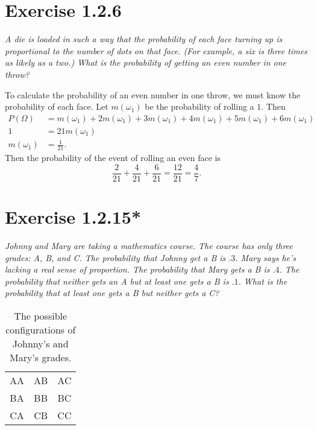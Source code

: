 \documentclass{tufte-handout}
\begin{document}
\section{Exercise 1.2.6}

\begin{description}
\item \textit{A die is loaded in such a way that the probability of
    each face turning up is proportional to the number of dots on that
    face. (For example, a six is three times as likely as a two.) What
    is the probability of getting an even number in one throw?}
\end{description}

To calculate the probability of an even number in one throw, we must
know the probability of each face. Let $m(\omega_1)$ be the probability of
rolling a $1$. Then
\begin{align*}
  P(\Omega) &= m(\omega_1) + 2m(\omega_1) + 3m(\omega_1) + 4m(\omega_1) +
  5m(\omega_1) + 6m(\omega_1)\\
  1 &= 21m(\omega_1)\\
  m(\omega_1) &= \frac{1}{21}.
\end{align*}
Then the probability of the event of rolling an even face is
\[\frac{2}{21} + \frac{4}{21} + \frac{6}{21} = \frac{12}{21} =
\frac{4}{7}.\]

\section{Exercise 1.2.15*}

\begin{description}
\item \textit{Johnny and Mary are taking a mathematics course. The course has
    only three grades: A, B, and C. The probability that Johnny get a
    B is $.3$. Mary says he's lacking a real sense of proportion. The
    probability that Mary gets a B is $.4$. The probability that
    neither gets an A but at least one gets a B is $.1$. What is the
    probability that at least one gets a B but neither gets a C?}
\end{description}

\begin{table}[h]
  \centering
  \begin{tabular}{ccc}
    \toprule
    AA & AB & AC \\
    BA & BB & BC \\
    CA & CB & CC \\
    \bottomrule
  \end{tabular}
  \caption{The possible configurations of Johnny's and Mary's grades.}
  \label{tab:1.2.15}
\end{table}
\end{document}
